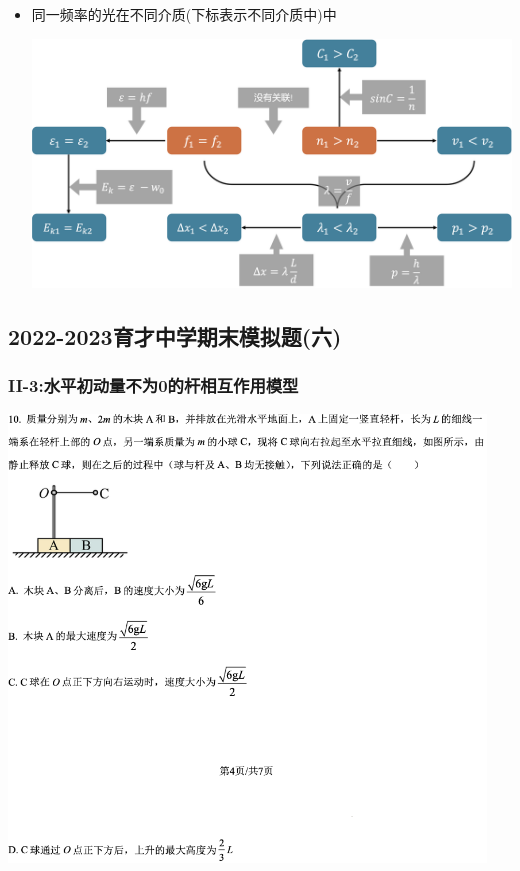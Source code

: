 \documentclass{article}
\begin{document}
\begin{itemize}
\begin{formal}
\begin{itemize}
                        \vspace*{2em}

                  \item 同一频率的光在不同介质(下标表示不同介质中)中

                        \vspace*{1em}
                        \includegraphics[width=40em,keepaspectratio]{./pictures/1.4-6.png}
              \end{itemize}
          \end{formal}
\end{itemize}

\vspace{2em}

\subsection{2022-2023育才中学期末模拟题(六)}
\subsubsection{II-3:水平初动量不为0的杆相互作用模型}

\includegraphics[width=0.95\textwidth,keepaspectratio]{./pictures/1.5-1.png}
\end{document}
